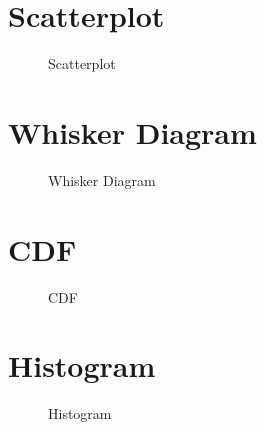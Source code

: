 \documentclass[
    oneside,        
    12pt
    ]{scrbook}
\begin{document}
\chapter{Scatterplot}
	\begin{figure}[h]
    \caption[Results filtered: Scatterplot.]{Scatterplot}
    \label{appendix:filtered:scatterplot}
   	\end{figure}
   	
\chapter{Whisker Diagram}
	\begin{figure}[h]
    \caption[Results filtered: Whisker Diagram.]{Whisker Diagram}
    \label{appendix:filtered:whiskerDiagram}
   	\end{figure}
   	
\chapter{CDF}
	\begin{figure}[h]
    \caption[Results filtered: CDF.]{CDF}
    \label{appendix:filtered:cdf}
   	\end{figure}
   	
\chapter{Histogram}
	\begin{figure}[h]
    \caption[Results filtered: Histogram.]{Histogram}
    \label{appendix:filtered:histogram}
   	\end{figure}
\end{document}
